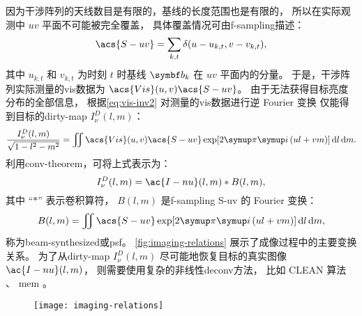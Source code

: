 因为干涉阵列的天线数目是有限的，基线的长度范围也是有限的，
所以在实际观测中 $uv$ 平面不可能被完全覆盖，
具体覆盖情况可由\acf{f-sampling}描述：
\begin{equation}
  \label{eq:sf}
  \acs{S-uv} = \sum_{k,t} \delta(u - u_{k,t}, v - v_{k,t}) ,
\end{equation}
其中 $u_{k,t}$ 和 $v_{k,t}$ 为时刻 $t$ 时基线 $\B{b}_k$ 在 $uv$ 平面内的分量。
于是，干涉阵列实际测量的\ac{vis}数据为 $\acs{Vis}(u,v) \acs{S-uv}$。
由于无法获得目标亮度分布的全部信息，
根据\autoref{eq:vis-inv2} 对测量的\ac{vis}数据进行逆 Fourier 变换
仅能得到目标的\acf{dirty-map} $I_{\nu}^D(l,m)$：
\begin{equation}
  \label{eq:dirty-map}
  \frac{I_{\nu}^D(l,m)}{\sqrt{1-l^2-m^2}} = \iint
    \acs{Vis}(u,v) \acs{S-uv} \exp [2\Cpi\Ci\, (ul+vm)] \,\D{l}\,\D{m} .
\end{equation}
利用\ac{conv-theorem}，可将上式表示为：
\begin{equation}
  I_{\nu}^D(l,m) = \ac{I-nu}(l,m) * B(l,m) ,
\end{equation}
其中 \enquote{$*$} 表示卷积算符，
$B(l, m)$ 是\ac{f-sampling} \acs{S-uv} 的 Fourier 变换：
\begin{equation}
  \label{eq:syn-beam}
  B(l,m) = \iint \acs{S-uv} \exp [2\Cpi\Ci\, (ul+vm)] \,\D{l}\,\D{m} ,
\end{equation}
称为\acf{beam-synthesized}或\acf{psf}。
\autoref{fig:imaging-relations} 展示了成像过程中的主要变换关系。
为了从\ac{dirty-map} $I_{\nu}^D(l,m)$ 尽可能地恢复目标的真实图像 $\ac{I-nu}(l,m)$，
则需要使用复杂的非线性\ac{deconv}方法，
比如 CLEAN 算法 \cite{hogbom1974,cornwell1999}、
\ac{mem} \cite{narayan1986}。

\begin{figure}[htp]
  \centering
  \texttt{[image: imaging-relations]}
  \label{fig:imaging-relations}
\end{figure}

